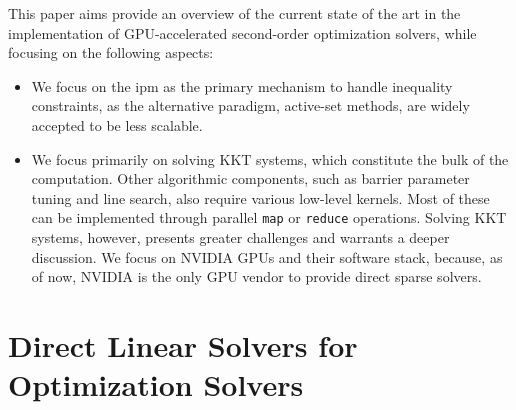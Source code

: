 \documentclass{article}
\begin{document}
This paper aims provide an overview of the current state of the art in the implementation of GPU-accelerated second-order optimization solvers, while focusing on the following aspects:
\begin{itemize}[leftmargin=*,itemsep=0pt,parsep=0pt,partopsep=0pt]
\item We focus on the \gls*{ipm} as the primary mechanism to handle inequality constraints, as the alternative paradigm, active-set methods, are widely accepted to be less scalable.
\item We focus primarily on solving KKT systems, which constitute the bulk of the computation. Other algorithmic components, such as barrier parameter tuning and line search, also require various low-level kernels.
Most of these can be implemented through %
parallel \texttt{map} or \texttt{reduce} operations.
Solving KKT systems, however, presents greater challenges and warrants a deeper discussion.
We focus on NVIDIA GPUs and their software stack, because, as of now, NVIDIA is the only GPU vendor to provide direct sparse solvers.
\end{itemize}


\section{Direct Linear Solvers for Optimization Solvers}\label{eqn:linear}
\end{document}

